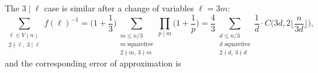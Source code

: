 \documentclass{article}
\theoremstyle{plain}
\theoremstyle{definition}
\theoremstyle{remark}
\begin{document}
The $3\mid\ell$ case is similar after a change of variables $\ell=3m$:
\[
\sum_{\substack{\ell\in V(n)\\2\nmid\ell,~3\mid\ell}}f(\ell)^{-1}
=\bigg(1+\frac{1}{3}\bigg)\sum_{\substack{m\leq n/3\\m\text{ squarefree}\\2\nmid m,~3\nmid m}}\prod_{p\mid m}\bigg(1+\frac{1}{p}\bigg)
=\frac{4}{3}\sum_{\substack{d\leq n/3\\d\text{ squarefree}\\2\nmid d,~3\nmid d}}\frac{1}{d}\cdot C\bigg(3d,2\bigg\lfloor\frac{n}{3d}\bigg\rfloor\bigg),
\]
and the corresponding error of approximation is
\end{document}
